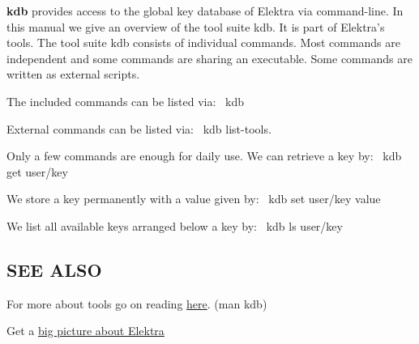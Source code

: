 {\bfseries kdb} provides access to the global key database of Elektra via command-\/line. In this manual we give an overview of the tool suite {\ttfamily kdb}. It is part of Elektra’s tools. The tool suite {\ttfamily kdb} consists of individual commands. Most commands are independent and some commands are sharing an executable. Some commands are written as external scripts.

The included commands can be listed via\+:~\newline
 {\ttfamily kdb}

External commands can be listed via\+:~\newline
 {\ttfamily kdb list-\/tools}.

Only a few commands are enough for daily use. We can retrieve a key by\+:~\newline
 {\ttfamily kdb get user/key}

We store a key permanently with a value given by\+:~\newline
 {\ttfamily kdb set user/key value}

We list all available keys arranged below a key by\+:~\newline
 {\ttfamily kdb ls user/key}

\subsection*{S\+EE A\+L\+SO}


\begin{DoxyItemize}
\item For more about tools go on reading \hyperlink{doc_help_kdb_md}{here}. ({\ttfamily man kdb})
\item Get a \hyperlink{doc_BIGPICTURE_md}{big picture about Elektra} 
\end{DoxyItemize}